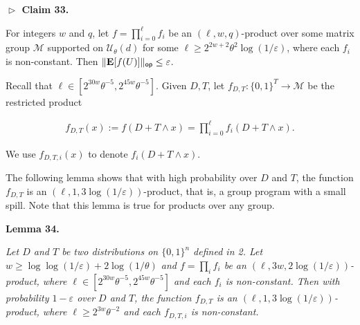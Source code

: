 \documentclass[10pt,a4paper]{article}
\begin{document}


\par\medskip\noindent\textbf{
$\vartriangleright$ Claim 33. }\par



For integers $w$ and $q$, let $f=\prod_{i=0}^{\ell}f_{i}$ be an $(\ell,w,q)$-product over some matrix group $\mathcal{M}$ supported on $\mathcal{U}_{\theta}(d)$ for some $\ell\geq 2^{2w+2}\theta^{2}\log(1/\varepsilon)$, where each $f_{i}$ is non-constant.
Then $\lVert\mathop{\bf E\/}[f(U)]\rVert_{\mathsf{op}}\leq\varepsilon$.\par






Recall that $\ell\in[2^{30w}\theta^{-5},2^{45w}\theta^{-5}]$.
Given $D,T$, let $f_{D,T}\colon\{0,1\}^{T}\to\mathcal{M}$ be the restricted product\par


\[\begin{gathered}
f_{D,T}(x):=f(D+T\wedge x)=\prod_{i=0}^{\ell}f_{i}(D+T\wedge x).
\end{gathered}\]


We use $f_{D,T,i}(x)$ to denote $f_{i}(D+T\wedge x)$.\par




The following lemma shows that with high probability over $D$ and $T$, the function $f_{D,T}$ is an $(\ell,1,3\log(1/\varepsilon))$-product, that is, a group program with a small spill.
Note that this lemma is true for products over any group.\par





\par\medskip\noindent\textbf{
\textbf{Lemma 34}\textbf{.}
}\par



\emph{Let $D$ and $T$ be two distributions on $\{0,1\}^{n}$ defined in  2.
Let $w\geq\log\log(1/\varepsilon)+2\log(1/\theta)$ and $f=\prod_{i}f_{i}$ be an $(\ell,3w,2\log(1/\varepsilon))$-product, where $\ell\in[2^{30w}\theta^{-5},2^{45w}\theta^{-5}]$ and each $f_{i}$ is non-constant.
Then with probability $1-\varepsilon$ over $D$ and $T$, the function $f_{D,T}$ is an $(\ell,1,3\log(1/\varepsilon))$-product, where $\ell\geq 2^{3w}\theta^{-2}$ and each $f_{D,T,i}$ is non-constant.}\par
\end{document}

